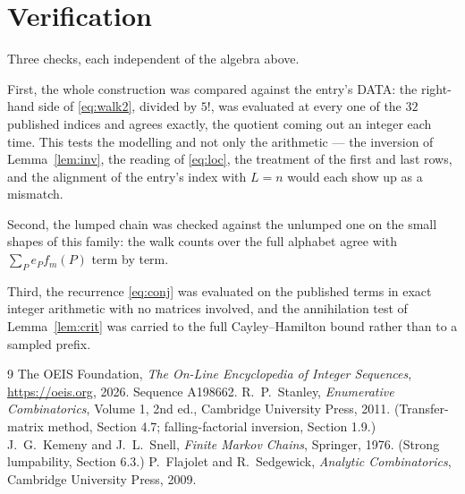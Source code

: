 \documentclass[11pt,a4paper]{article}
\theoremstyle{plain}
\theoremstyle{definition}
\begin{document}
\section{Verification}

Three checks, each independent of the algebra above.

First, the whole construction was compared against the entry's DATA: the right-hand side of
\eqref{eq:walk2}, divided by $5!$, was evaluated at every one of the $32$
published indices and agrees exactly, the quotient coming out an integer each time. This
tests the modelling and not only the arithmetic --- the inversion of Lemma~\ref{lem:inv},
the reading of \eqref{eq:loc}, the treatment of the first and last rows, and the
alignment of the entry's index with $L=n$ would each show up as a mismatch.

Second, the lumped chain was checked against the unlumped one on the small shapes of this
family: the walk counts over the full alphabet agree with $\sum_P e_Pf_m(P)$ term by term.

Third, the recurrence \eqref{eq:conj} was evaluated on the published terms in exact integer
arithmetic with no matrices involved, and the annihilation test of Lemma~\ref{lem:crit} was
carried to the full Cayley--Hamilton bound rather than to a sampled prefix.

\begin{thebibliography}{9}
 The OEIS Foundation, \emph{The On-Line Encyclopedia of Integer
Sequences}, \url{https://oeis.org}, 2026. Sequence A198662.
 R.~P.~Stanley, \emph{Enumerative Combinatorics}, Volume 1, 2nd ed.,
Cambridge University Press, 2011. (Transfer-matrix method, Section 4.7; falling-factorial
inversion, Section 1.9.)
 J.~G.~Kemeny and J.~L.~Snell, \emph{Finite Markov Chains}, Springer,
1976. (Strong lumpability, Section 6.3.)
 P.~Flajolet and R.~Sedgewick, \emph{Analytic Combinatorics}, Cambridge
University Press, 2009.
\end{thebibliography}
\end{document}
